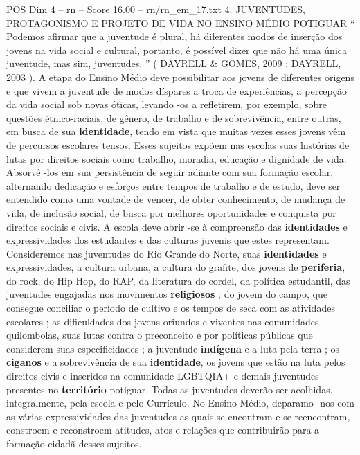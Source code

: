 \begin{textsample}{POS Dim 4 – rn – Score 16.00 – rn/rn\_em\_17.txt}  \label{ex:f4_pos_081}
4.
JUVENTUDES, PROTAGONISMO E PROJETO DE VIDA NO ENSINO MÉDIO POTIGUAR “ Podemos afirmar que a juventude é plural, há diferentes modos de inserção dos jovens na vida social e cultural, portanto, é possível dizer que não há uma única juventude, mas sim, juventudes. ” ( DAYRELL \& GOMES, 2009 ; DAYRELL, 2003 ).
A etapa do Ensino Médio deve possibilitar aos jovens de diferentes origens e que vivem a juventude de modos díspares a troca de experiências, a percepção da vida social sob novas óticas, levando -os a refletirem, por exemplo, sobre questões étnico-raciais, de gênero, de trabalho e de sobrevivência, entre outras, em busca de sua \textbf{identidade}, tendo em vista que muitas vezes esses jovens vêm de percursos escolares tensos.
Esses sujeitos expõem nas escolas suas histórias de lutas por direitos sociais como trabalho, moradia, educação e dignidade de vida.
Absorvê -los em sua persistência de seguir adiante com sua formação escolar, alternando dedicação e esforços entre tempos de trabalho e de estudo, deve ser entendido como uma vontade de vencer, de obter conhecimento, de mudança de vida, de inclusão social, de busca por melhores oportunidades e conquista por direitos sociais e civis.
A escola deve abrir -se à compreensão das \textbf{identidades} e expressividades dos estudantes e das culturas juvenis que estes representam.
Consideremos nas juventudes do Rio Grande do Norte, suas \textbf{identidades} e expressividades, a cultura urbana, a cultura do grafite, dos jovens de \textbf{periferia}, do rock, do Hip Hop, do RAP, da literatura do cordel, da política estudantil, das juventudes engajadas nos movimentos \textbf{religiosos} ; do jovem do campo, que consegue conciliar o período de cultivo e os tempos de seca com as atividades escolares ; as dificuldades dos jovens oriundos e viventes nas comunidades quilombolas, suas lutas contra o preconceito e por políticas públicas que considerem suas especificidades ; a juventude \textbf{indígena} e a luta pela terra ; os \textbf{ciganos} e a sobrevivência de sua \textbf{identidade}, os jovens que estão na luta pelos direitos civis e inseridos na comunidade LGBTQIA+ e demais juventudes presentes no \textbf{território} potiguar.
Todas as juventudes deverão ser acolhidas, integralmente, pela escola e pelo Currículo.
No Ensino Médio, deparamo -nos com as várias expressividades das juventudes as quais se encontram e se reencontram, constroem e reconstroem atitudes, atos e relações que contribuirão para a formação cidadã desses sujeitos.

\end{textsample}
